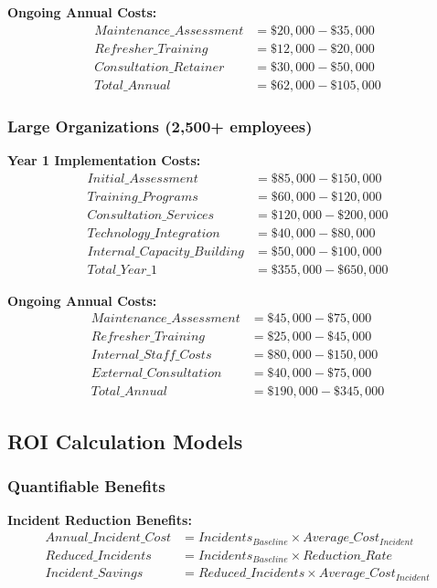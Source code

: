 \documentclass[11pt,a4paper]{article}
\begin{document}
\textbf{Ongoing Annual Costs:}
\begin{align}
Maintenance\_Assessment &= \$20,000 - \$35,000 \\
Refresher\_Training &= \$12,000 - \$20,000 \\
Consultation\_Retainer &= \$30,000 - \$50,000 \\
Total\_Annual &= \$62,000 - \$105,000
\end{align}

\subsubsection{Large Organizations (2,500+ employees)}

\textbf{Year 1 Implementation Costs:}
\begin{align}
Initial\_Assessment &= \$85,000 - \$150,000 \\
Training\_Programs &= \$60,000 - \$120,000 \\
Consultation\_Services &= \$120,000 - \$200,000 \\
Technology\_Integration &= \$40,000 - \$80,000 \\
Internal\_Capacity\_Building &= \$50,000 - \$100,000 \\
Total\_Year\_1 &= \$355,000 - \$650,000
\end{align}

\textbf{Ongoing Annual Costs:}
\begin{align}
Maintenance\_Assessment &= \$45,000 - \$75,000 \\
Refresher\_Training &= \$25,000 - \$45,000 \\
Internal\_Staff\_Costs &= \$80,000 - \$150,000 \\
External\_Consultation &= \$40,000 - \$75,000 \\
Total\_Annual &= \$190,000 - \$345,000
\end{align}

\subsection{ROI Calculation Models}

\subsubsection{Quantifiable Benefits}

\textbf{Incident Reduction Benefits:}
\begin{align}
Annual\_Incident\_Cost &= Incidents_{Baseline} \times Average\_Cost_{Incident} \\
Reduced\_Incidents &= Incidents_{Baseline} \times Reduction\_Rate \\
Incident\_Savings &= Reduced\_Incidents \times Average\_Cost_{Incident}
\end{align}
\end{document}
